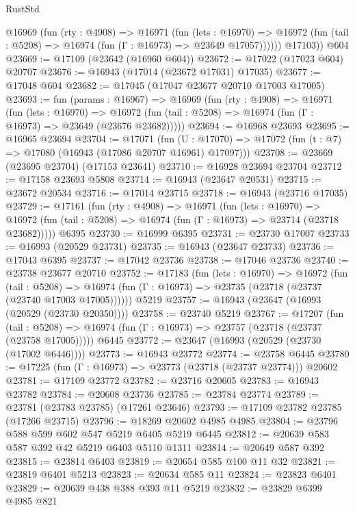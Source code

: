 \begin{lexlean}{RustStd}
\begin{coremodule}
          @16969
            (fun (rty : @4908) =>
            @16971
              (fun (lets : @16970) =>
              @16972 (fun (tail : @5208) => @16974 (fun (Γ : @16973) => @23649 @17057))))))
        @17103))
    @604
@23669 := @17109 (@23642 (@16960 @604))
@23672 := @17022 (@17023 @604) @20707
@23676 := @16943 (@17014 (@23672 @17031) @17035)
@23677 := @17048 @604
@23682 := @17045 (@17047 @23677 @20710 @17003 @17005)
@23693 := fun (params : @16967) =>
  @16969
    (fun (rty : @4908) =>
    @16971
      (fun (lets : @16970) =>
      @16972 (fun (tail : @5208) => @16974 (fun (Γ : @16973) => @23649 (@23676 @23682)))))
@23694 := @16968 @23693
@23695 := @16965 @23694
@23704 := @17071
    (fun (U : @17070) => @17072 (fun (t : @7) => @17080 (@16943 (@17086 @20707 @16961) @17097)))
@23708 := @23669 (@23695 @23704) (@17153 @23641)
@23710 := @16928 @23694 @23704
@23712 := @17158 @23693 @5808
@23714 := @16943 (@23647 @20531)
@23715 := @23672 @20534
@23716 := @17014 @23715
@23718 := @16943 (@23716 @17035)
@23729 := @17161
    (fun (rty : @4908) =>
    @16971
      (fun (lets : @16970) =>
      @16972 (fun (tail : @5208) => @16974 (fun (Γ : @16973) => @23714 (@23718 @23682)))))
    @6395
@23730 := @16999 @6395
@23731 := @23730 @17007
@23733 := @16993 (@20529 @23731)
@23735 := @16943 (@23647 @23733)
@23736 := @17043 @6395
@23737 := @17042 @23736
@23738 := @17046 @23736
@23740 := @23738 @23677 @20710
@23752 := @17183
    (fun (lets : @16970) =>
    @16972
      (fun (tail : @5208) =>
      @16974 (fun (Γ : @16973) => @23735 (@23718 (@23737 (@23740 @17003 @17005))))))
    @5219
@23757 := @16943 (@23647 (@16993 (@20529 (@23730 @20350))))
@23758 := @23740 @5219
@23767 := @17207
    (fun (tail : @5208) => @16974 (fun (Γ : @16973) => @23757 (@23718 (@23737 (@23758 @17005)))))
    @6445
@23772 := @23647 (@16993 (@20529 (@23730 (@17002 @6446))))
@23773 := @16943 @23772
@23774 := @23758 @6445
@23780 := @17225 (fun (Γ : @16973) => @23773 (@23718 (@23737 @23774))) @20602
@23781 := @17109 @23772
@23782 := @23716 @20605
@23783 := @16943 @23782
@23784 := @20608 @23736
@23785 := @23784 @23774
@23789 := @23781 (@23783 @23785) (@17261 @23646)
@23793 := @17109 @23782 @23785 (@17266 @23715)
@23796 := @18269 @20602 @4985 @4985
@23804 := @23796 @588 @599 @602 @547 @5219 @6405 @5219 @6445
@23812 := @20639 @583 @587 @392 @42 @5219 @6403 @5110 @1311
@23814 := @20649 @587 @392
@23815 := @23814 @6403
@23819 := @20654 @585 @100 @11 @32
@23821 := @23819 @6401 @5213
@23823 := @20634 @585 @11
@23824 := @23823 @6401
@23829 := @20639 @438 @388 @393 @11 @5219
@23832 := @23829 @6399 @4985 @821

\end{coremodule}
\end{lexlean}
